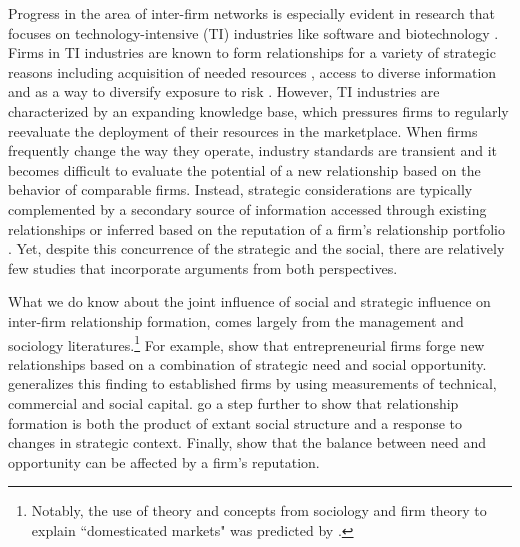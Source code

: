 \documentclass[12pt]{article}
\begin{document}
Progress in the area of inter-firm networks is especially evident in research that focuses on technology-intensive (TI) industries like software and biotechnology \cite{867, 469, 775}. Firms in TI industries are known to form relationships for a variety of strategic reasons including acquisition of needed resources \cite{878}, access to diverse information \cite{512} and as a way to diversify exposure to risk \cite{775}. However, TI industries are characterized by an expanding knowledge base, which pressures firms to regularly reevaluate the deployment of their resources in the marketplace. When firms frequently change the way they operate, industry standards are transient and it becomes difficult to evaluate the potential of a new relationship based on the behavior of comparable firms. Instead, strategic considerations are typically complemented by a secondary source of information accessed through existing relationships or inferred based on the reputation of a firm's relationship portfolio \cite{496, 684}. Yet, despite this concurrence of the strategic and the social, there are relatively few studies that incorporate arguments from both perspectives.

What we do know about the joint influence of social and strategic influence on inter-firm relationship formation, comes largely from the management and sociology literatures.\footnote{Notably, the use of theory and concepts from sociology and firm theory to explain ``domesticated markets" was predicted by .} For example,  show that entrepreneurial firms forge new relationships based on a combination of strategic need and social opportunity.  generalizes this finding to established firms by using measurements of technical, commercial and social capital.  go a step further to show that relationship formation is both the product of extant social structure and a response to changes in strategic context. Finally,  show that the balance between need and opportunity can be affected by a firm's reputation.
\end{document}
